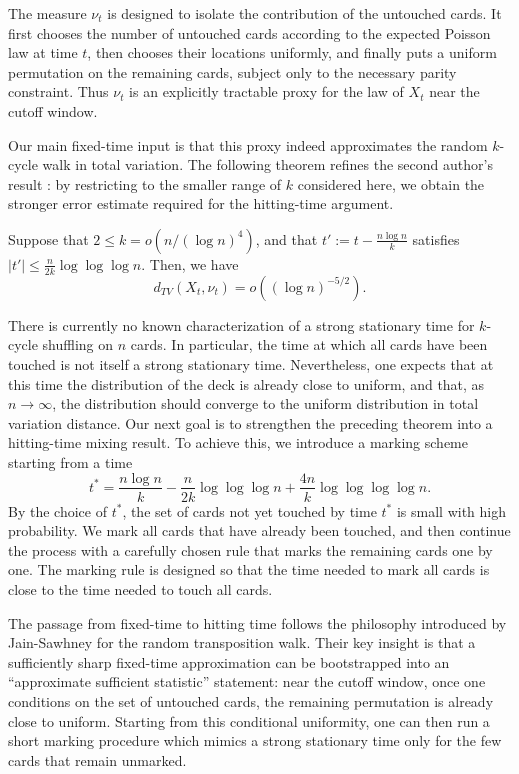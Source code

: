 The measure $\nu_t$ is designed to isolate the contribution of the untouched
cards. It first chooses the number of untouched cards according to the expected
Poisson law at time $t$, then chooses their locations uniformly, and finally
puts a uniform permutation on the remaining cards, subject only to the necessary
parity constraint. Thus $\nu_t$ is an explicitly tractable proxy for the law of
$X_t$ near the cutoff window.

Our main fixed-time input is that this proxy indeed approximates the random
$k$-cycle walk in total variation. The following theorem refines the second author's result \cite[Theorem 1.6]{shen2026k}: by restricting to the smaller range of $k$ considered here, we obtain the stronger error estimate required for the hitting-time argument.

\begin{thm}\label{thm: X and nu}
Suppose that \(2\le k=o(n/(\log n)^4)\), and that
$t' := t-\frac{n\log n}{k}$ satisfies
$|t'|\le \frac{n}{2k}\log\log\log n$. Then, we have
$$d_{TV}(X_t,\nu_t)=o\left((\log n)^{-5/2}\right).$$
\end{thm}

There is currently no known characterization of a strong stationary time for
$k$-cycle shuffling on $n$ cards. In particular, the time at which all
cards have been touched is not itself a strong stationary time. Nevertheless,
one expects that at this time the distribution of the deck is already close to
uniform, and that, as $n\to\infty$, the distribution should converge to the
uniform distribution in total variation distance. Our next goal is to strengthen
the preceding theorem into a hitting-time mixing result. To achieve this, we introduce a marking scheme starting from a time
\begin{equation}\label{eq: starting time of marking scheme}
    t^*= \frac{n\log n}{k}
    -\frac{n}{2k}\log\log\log n+\frac{4n}{k}\log\log\log\log n .
\end{equation}
By the choice of $t^*$, the set of cards not yet touched by time $t^*$ is small with high probability. We mark all cards that have already been touched, and then continue the process with a carefully chosen rule that marks the remaining
cards one by one. The marking rule is designed so that the time needed to mark all cards is close to the time needed to touch all cards.

The passage from fixed-time to hitting time follows the philosophy introduced by Jain-Sawhney for the random transposition walk. Their key insight is that a sufficiently sharp fixed-time approximation can be bootstrapped into an
``approximate sufficient statistic'' statement: near the cutoff window, once one conditions on the set of untouched cards, the remaining permutation is already close to uniform. Starting from this conditional uniformity, one can then run a
short marking procedure which mimics a strong stationary time only for the few cards that remain unmarked.

